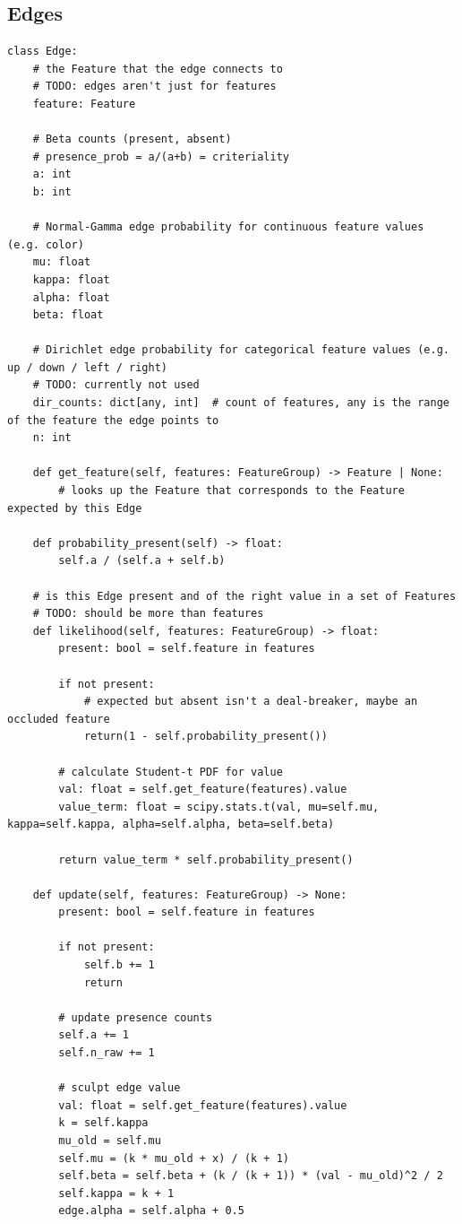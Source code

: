 \documentclass{article}
\begin{document}
\subsection{Edges}\label{pseudocode:edges}
\begin{verbatim}
class Edge:
    # the Feature that the edge connects to
    # TODO: edges aren't just for features
    feature: Feature

    # Beta counts (present, absent)
    # presence_prob = a/(a+b) = criteriality
    a: int
    b: int

    # Normal-Gamma edge probability for continuous feature values (e.g. color)
    mu: float
    kappa: float
    alpha: float
    beta: float

    # Dirichlet edge probability for categorical feature values (e.g. up / down / left / right)
    # TODO: currently not used
    dir_counts: dict[any, int]  # count of features, any is the range of the feature the edge points to
    n: int

    def get_feature(self, features: FeatureGroup) -> Feature | None:
        # looks up the Feature that corresponds to the Feature expected by this Edge

    def probability_present(self) -> float:
        self.a / (self.a + self.b)

    # is this Edge present and of the right value in a set of Features
    # TODO: should be more than features
    def likelihood(self, features: FeatureGroup) -> float:
        present: bool = self.feature in features
    
        if not present:
            # expected but absent isn't a deal-breaker, maybe an occluded feature
            return(1 - self.probability_present())

        # calculate Student-t PDF for value
        val: float = self.get_feature(features).value
        value_term: float = scipy.stats.t(val, mu=self.mu, kappa=self.kappa, alpha=self.alpha, beta=self.beta)
    
        return value_term * self.probability_present()

    def update(self, features: FeatureGroup) -> None:
        present: bool = self.feature in features

        if not present:
            self.b += 1
            return

        # update presence counts
        self.a += 1
        self.n_raw += 1

        # sculpt edge value
        val: float = self.get_feature(features).value
        k = self.kappa
        mu_old = self.mu
        self.mu = (k * mu_old + x) / (k + 1)
        self.beta = self.beta + (k / (k + 1)) * (val - mu_old)^2 / 2
        self.kappa = k + 1
        edge.alpha = self.alpha + 0.5
\end{verbatim}
\end{document}
